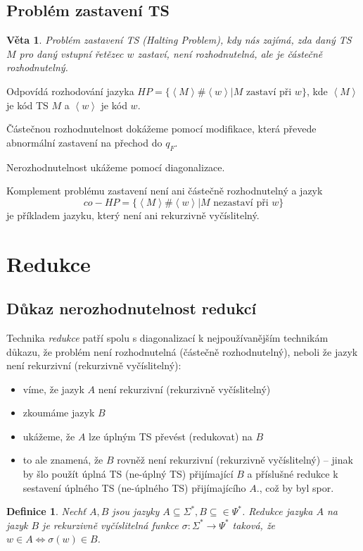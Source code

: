 \documentclass[a4paper, 11pt]{report}
\newtheorem{mydef}{Definice}[chapter]
\newtheorem{veta}{Věta}[chapter]
\begin{document}
\subsection{Problém zastavení TS}

\begin{veta}
Problém zastavení TS (Halting Problem), kdy nás zajímá, zda daný TS $M$ pro daný vstupní řetězec $w$ zastaví, není rozhodnutelná, ale je částečně rozhodnutelný.
\end{veta}
Odpovídá rozhodování jazyka $HP = \{\left<M\right>\#\left<w\right> | M \text{ zastaví při } w\}$, kde $\left<M\right>$ je kód TS $M$ a $\left<w\right>$ je kód $w$.

Částečnou rozhodnutelnost dokážeme pomocí modifikace, která převede abnormální zastavení na přechod do $q_F$.

Nerozhodnutelnost ukážeme pomocí diagonalizace.

Komplement problému zastavení není ani částečně rozhodnutelný a jazyk
$$co-HP = \{\left<M\right>\#\left<w\right> | M \text{ nezastaví při } w\}$$
je příkladem jazyku, který není ani rekurzivně vyčíslitelný.

\section{Redukce}
\subsection{Důkaz nerozhodnutelnost redukcí}
Technika \emph{redukce} patří spolu s diagonalizací k nejpoužívanějším technikám důkazu, že problém není rozhodnutelná (částečně rozhodnutelný), neboli že jazyk není rekurzivní (rekurzivně vyčíslitelný):
\begin{itemize}
	\item víme, že jazyk $A$ není rekurzivní (rekurzivně vyčíslitelný)
	\item zkoumáme jazyk $B$
	\item ukážeme, že $A$ lze úplným TS převést (redukovat) na $B$
	\item to ale znamená, že $B$ rovněž není rekurzivní (rekurzivně vyčíslitelný) -- jinak by šlo použít úplná TS (ne-úplný TS) přijímající $B$ a příslušné redukce k sestavení úplného TS (ne-úplného TS) přijímajícího $A$., což by byl spor.
\end{itemize}

\begin{mydef}
Nechť $A, B$ jsou jazyky $A \subseteq \Sigma^*, B \subseteq \in \Psi^*$. Redukce jazyka $A$ na jazyk $B$ je rekurzivně vyčíslitelná funkce $\sigma: \Sigma^* \to \Psi^*$ taková, že $w \in A \Leftrightarrow \sigma(w) \in B$.
\end{mydef}
\end{document}
